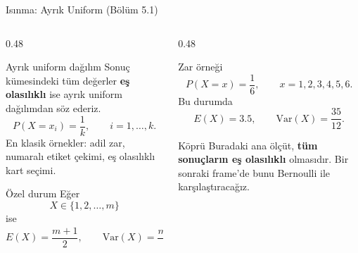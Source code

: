 \documentclass[light]{lutbeamer}
\begin{document}
\begin{frame}{Isınma: Ayrık Uniform (Bölüm 5.1)}
    \scriptsize
    \begin{columns}[T]
        \begin{column}{0.48\textwidth}
            \begin{block}{Ayrık uniform dağılım}
                Sonuç kümesindeki tüm değerler \textbf{eş olasılıklı} ise ayrık uniform dağılımdan söz ederiz.
                \[
                P(X=x_i)=\frac{1}{k}, \qquad i=1,\dots,k.
                \]
                En klasik örnekler: adil zar, numaralı etiket çekimi, eş olasılıklı kart seçimi.
            \end{block}

            \begin{exampleblock}{Özel durum}
                Eğer
                \[
                X \in \{1,2,\dots,m\}
                \]
                ise
                \[
                E(X)=\frac{m+1}{2}, \qquad \mathrm{Var}(X)=\frac{m^2-1}{12}.
                \]
            \end{exampleblock}
        \end{column}
        \begin{column}{0.48\textwidth}
            \begin{block}{Zar örneği}
                \[
                P(X=x)=\frac{1}{6}, \qquad x=1,2,3,4,5,6.
                \]
                Bu durumda
                \[
                E(X)=3.5, \qquad \mathrm{Var}(X)=\frac{35}{12}.
                \]
            \end{block}

            \begin{exampleblock}{Köprü}
                Buradaki ana ölçüt, \textbf{tüm sonuçların eş olasılıklı} olmasıdır.
                Bir sonraki frame'de bunu Bernoulli ile karşılaştıracağız.
            \end{exampleblock}
        \end{column}
    \end{columns}
\end{frame}
\end{document}
